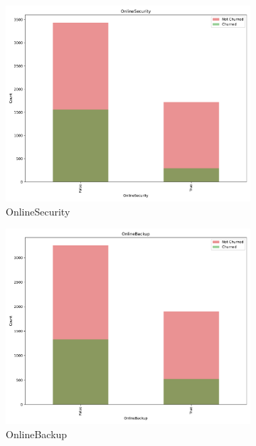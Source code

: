 \documentclass[a4paper,11pt]{article}
\begin{document}
\begin{landscape}
\begin{figure}
\begin{subfigure}{0.14\linewidth}
        \includegraphics[width=\linewidth]{figures/understanding/OnlineSecurity.pdf}
        \caption{OnlineSecurity}
    \end{subfigure}
    \begin{subfigure}{0.14\linewidth}
        \includegraphics[width=\linewidth]{figures/understanding/OnlineBackup.pdf}
        \caption{OnlineBackup}
    \end{subfigure}
    \begin{subfigure}{0.14\linewidth}

\end{subfigure}
\end{figure}
\end{landscape}
\end{document}
